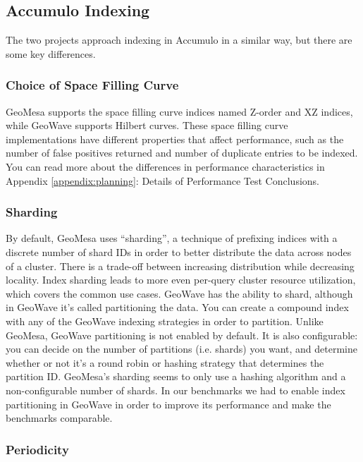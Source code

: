 \subsection{Accumulo Indexing}
\label{sec:featurecompare:indexing}

The two projects approach indexing in Accumulo in a similar way, but there are some key differences.

\subsubsection{Choice of Space Filling Curve}
\label{sec:featurecompare:indexing:curve}

GeoMesa supports the space filling curve indices named Z-order and XZ indices, while GeoWave supports Hilbert curves.
These space filling curve implementations have different properties that affect performance, such as the number of false positives returned and number of duplicate entries to be indexed.
You can read more about the differences in performance characteristics in Appendix \ref{appendix:planning}: Details of Performance Test Conclusions.

\subsubsection{Sharding}
\label{sec:featurecompare:indexing:sharding}

By default, GeoMesa uses ``sharding'', a technique of prefixing indices with a discrete number of shard IDs in order to better distribute the data across nodes of a cluster.
There is a trade-off between increasing distribution while decreasing locality.
Index sharding leads to more even per-query cluster resource utilization, which covers the common use cases.
GeoWave has the ability to shard, although in GeoWave it's called partitioning the data.
You can create a compound index with any of the GeoWave indexing strategies in order to partition.
Unlike GeoMesa, GeoWave partitioning is not enabled by default.
It is also configurable: you can decide on the number of partitions (i.e. shards) you want, and determine whether or not it's a round robin or hashing strategy that determines the partition ID.
GeoMesa's sharding seems to only use a hashing algorithm and a non-configurable number of shards.
In our benchmarks we had to enable index partitioning in GeoWave in order to improve its performance and make the benchmarks comparable.

\subsubsection{Periodicity}
\label{sec:featurecompare:indexing:periodicity}

